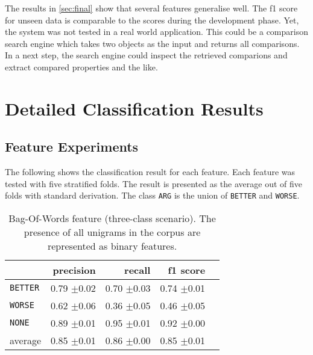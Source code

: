 The results in \ref{sec:final} show that several features generalise well. The f1 score for unseen data is comparable to the scores during the development phase. Yet, the system was not tested in a real world application. This could be a comparison search engine which takes two objects as the input and returns all comparisons. In a next step, the search engine could inspect the retrieved comparions and extract compared properties and the like.

\appendix

	\chapter{Detailed Classification Results}
\section{Feature Experiments}
	\setcounter{section}{1}
	The following shows the classification result for each feature. Each feature was tested with five stratified folds. The result is presented as the average out of five folds with standard derivation. The class \texttt{ARG} is the union of \texttt{BETTER} and \texttt{WORSE}.
	

	
	\begin{table}[htbp] 
		\centering 
		\caption{Bag-Of-Words feature (three-class scenario). The presence of all unigrams in the corpus are represented as binary features.} 
		\label{  }
		\begin{tabular}{@{}lrrrr@{}}
			\toprule
			        & precision                & recall                   & f1 score                 \\ \midrule 
			\texttt{BETTER}	&	 0.79 \scriptsize{$\pm$0.02} &	 0.70 \scriptsize{$\pm$0.03} &	 0.74 \scriptsize{$\pm$0.01}  \\ 
\texttt{WORSE}	&	 0.62 \scriptsize{$\pm$0.06} &	 0.36 \scriptsize{$\pm$0.05} &	 0.46 \scriptsize{$\pm$0.05}  \\ 
\texttt{NONE}	&	 0.89 \scriptsize{$\pm$0.01} &	 0.95 \scriptsize{$\pm$0.01} &	 0.92 \scriptsize{$\pm$0.00}  \\ 
average	&	 0.85 \scriptsize{$\pm$0.01} &	 0.86 \scriptsize{$\pm$0.00} &	 0.85 \scriptsize{$\pm$0.01}  \\ 			\bottomrule
		\end{tabular}
	\end{table}
	
